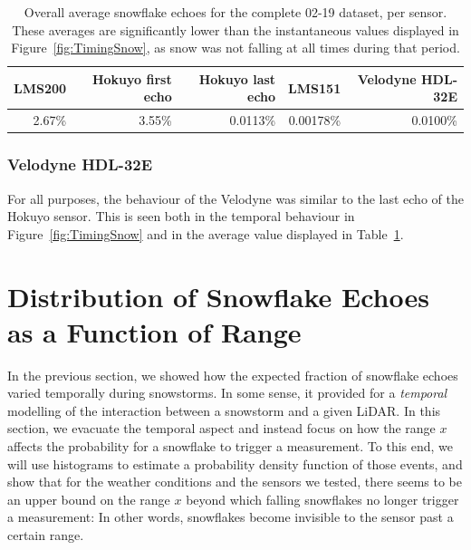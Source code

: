 \begin{table}
    \centering
    \begin{tabular}{@{}rrrrr@{}}
        \toprule
        \textbf{LMS200} & \textbf{Hokuyo first echo}     & \textbf{Hokuyo last echo}    & \textbf{LMS151} & \textbf{Velodyne HDL-32E} \\
        \hline
        2.67\%          &           3.55\%    &       0.0113\%     &   0.00178\%     &  0.0100\%  \\
        \bottomrule
    \end{tabular}
    \caption[Overall average snowflake echoes for the complete 02-19 dataset, per sensor.]{Overall average snowflake echoes for the complete 02-19 dataset, per sensor. These averages are significantly lower than the instantaneous values displayed in Figure~\ref{fig:TimingSnow}, as snow was not falling at all times during that period.}
    \label{tab:avgRates}
\end{table}

\subsubsection{Velodyne HDL-32E}
For all purposes, the behaviour of the Velodyne was similar to the last echo of the Hokuyo sensor. This is seen both in the temporal behaviour in Figure~\ref{fig:TimingSnow} and in the average value displayed in Table~\ref{tab:avgRates}.

\section{Distribution of Snowflake Echoes as a Function of Range}
\label{sec:chap_lidar_histo}

In the previous section, we showed how the expected fraction of snowflake echoes varied temporally during snowstorms. In some sense, it provided for a \emph{temporal} modelling of the interaction between a snowstorm and a given LiDAR. In this section, we evacuate the temporal aspect and instead focus on how the range $x$ affects the probability for a snowflake to trigger a measurement. To this end, we will use histograms to estimate a probability density function of those events, and show that for the weather conditions and the sensors we tested, there seems to be an upper bound on the range $x$ beyond which falling snowflakes no longer trigger a measurement: In other words, snowflakes become invisible to the sensor past a certain range.

